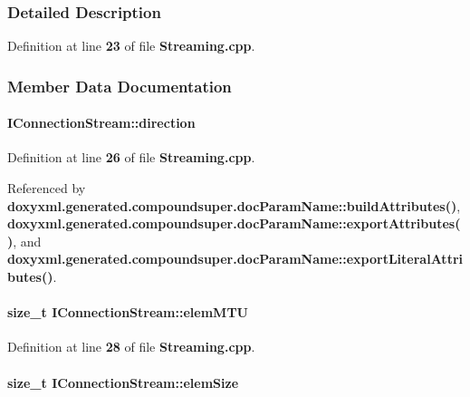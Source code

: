 \subsubsection{Detailed Description}


Definition at line {\bf 23} of file {\bf Streaming.\+cpp}.



\subsubsection{Member Data Documentation}
\paragraph[{direction}]{ I\+Connection\+Stream\+::direction}\label{structIConnectionStream_aa8af9f701a0c55acaf955459034c76fb}


Definition at line {\bf 26} of file {\bf Streaming.\+cpp}.



Referenced by {\bf doxyxml.\+generated.\+compoundsuper.\+doc\+Param\+Name\+::build\+Attributes()}, {\bf doxyxml.\+generated.\+compoundsuper.\+doc\+Param\+Name\+::export\+Attributes()}, and {\bf doxyxml.\+generated.\+compoundsuper.\+doc\+Param\+Name\+::export\+Literal\+Attributes()}.

\paragraph[{elem\+M\+TU}]{\setlength{\rightskip}{0pt plus 5cm}size\+\_\+t I\+Connection\+Stream\+::elem\+M\+TU}\label{structIConnectionStream_a1ac625b8668c37e6c916b331f8f39eb6}


Definition at line {\bf 28} of file {\bf Streaming.\+cpp}.

\paragraph[{elem\+Size}]{\setlength{\rightskip}{0pt plus 5cm}size\+\_\+t I\+Connection\+Stream\+::elem\+Size}\label{structIConnectionStream_a02f3a4e013ca02cab20557d3f6254fad}



